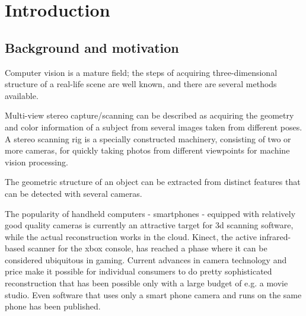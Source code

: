 \section{Introduction}



\thispagestyle{empty}

\subsection{Background and motivation}

Computer vision is a mature field; the steps of acquiring three-dimensional structure of a real-life scene are well known, and there are several methods available.

Multi-view stereo capture/scanning can be described as acquiring the geometry and color information of a subject from several images taken from different poses.
A stereo scanning rig is a specially constructed machinery, consisting of two or more cameras, for quickly taking photos from different viewpoints for machine vision processing.

The geometric structure of an object can be extracted from distinct features that can be detected with several cameras.

The popularity of handheld computers - smartphones - equipped with relatively good quality cameras is currently an attractive target for 3d scanning software, while the actual reconstruction works in the cloud.
Kinect, the active infrared-based scanner for the xbox console, has reached a phase where it can be considered ubiquitous in gaming.
Current advances in camera technology and price make it possible for individual consumers to do pretty sophisticated reconstruction that has been possible only with a large budget of e.g. a movie studio.
Even software that uses only a smart phone camera and runs on the same phone has been published.

